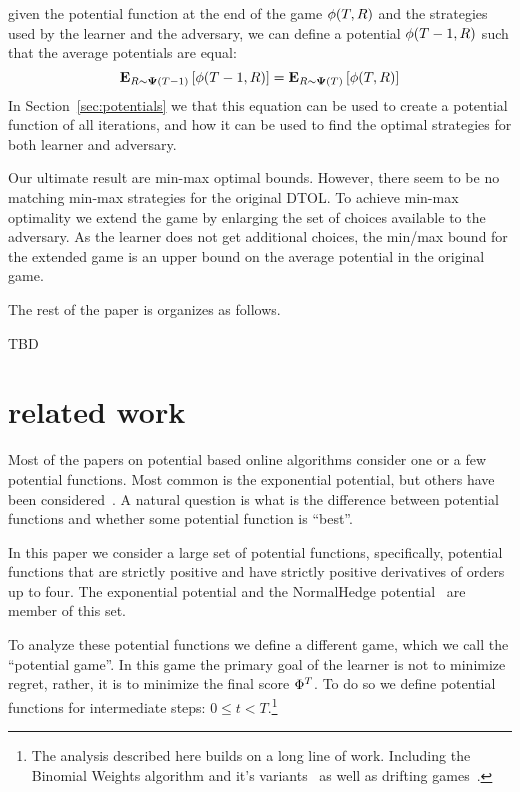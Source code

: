 \documentclass{article}[12pt]
\begin{document}
given the potential function at the end of the game $\phi(T,R)$ and
the strategies used by the learner and the adversary, we can define a
potential $\phi(T-1,R)$ such that the average potentials are equal:
\[
  {\bf E}_{R \sim {\bf \Psi}(T-1)}\left[ \phi(T-1,R) \right] = {\bf E}_{R \sim {\bf \Psi}(T)}\left[ \phi(T,R) \right]
\]
In Section~\ref{sec:potentials} we that this equation can be
used to create a potential function of all iterations, and how it can
be used to find the optimal strategies for both learner and adversary.

  Our ultimate result are min-max optimal bounds. However, there seem
  to be no matching min-max strategies for the original DTOL. To
  achieve min-max optimality we extend the game by enlarging the set of
  choices available to the adversary.  As the learner does not get
  additional choices, the min/max bound for the extended game is an
  upper bound on the average potential in the original game.

The rest of the paper is organizes as follows.

TBD

\section{related work}
Most of the papers on potential based online algorithms consider
one or a few potential functions. Most common is the exponential
potential, but others have been considered~\cite{cesa2006prediction}.
A natural question is what is the difference between potential
functions and whether some potential function is ``best''.

In this paper we consider a large set of potential functions,
specifically, potential functions that are strictly positive and have
strictly positive derivatives of orders up to four. The exponential
potential and the NormalHedge potential~\cite{chaudhuri2009parameter,luo2015achieving}
are member of this set. 

To analyze these potential functions we define a different
game, which we call the ``potential game''. In this game the primary
goal of the learner is not to minimize regret, rather, it is to
minimize the final score $\Phi^T$. To do so
we define potential functions for intermediate steps: $0 \leq t
<T$.\footnote{The analysis described here builds on a long line of
  work. Including the Binomial Weights algorithm and it's
  variants~\cite{cesa1996line,abernethy2006continuous,abernethy2008optimal}
  as well as drifting games~\cite{schapire2001drifting,freund2002drifting}.}
\end{document}
